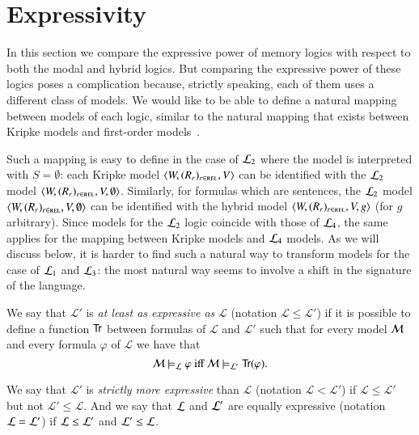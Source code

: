 \section{Expressivity}\label{expressivity}

In this section we compare the expressive power of memory logics
with respect to both the modal and hybrid logics.
But comparing the expressive power of these logics poses a complication
because, strictly speaking, each of them uses a different class of models.
We would like to be able to define a natural mapping between models
of each logic, similar to the natural mapping that exists between
Kripke models and first-order models~\cite{BRV01}.

Such a mapping is easy to define in the case of $\mathcal{L}_2$ where the model is interpreted with $S=\emptyset$: each
Kripke model $\langle W,(R_r)_{r \in \textsc{rel}},V \rangle$ can be identified with the $\mathcal{L}_2$
model $\langle W,(R_r)_{r \in \textsc{rel}}, V, \emptyset \rangle$. Similarly, for formulas
which are sentences, the $\mathcal{L}_2$ model $\langle W,(R_r)_{r \in \textsc{rel}},V,\emptyset \rangle$ can be identified with the hybrid model
$\langle W,(R_r)_{r \in \textsc{rel}},V,g \rangle$ (for $g$ arbitrary).
%
Since models for the $\mathcal{L}_2$ logic coincide with those of
$\mathcal{L}_4$, the same applies for the mapping between Kripke models
and $\mathcal{L}_4$ models.
%
As we will discuss below, it is harder to find such a natural way to
transform models for the case of $\mathcal{L}_1$ and $\mathcal{L}_3$: the most
natural way seems to involve a shift in the signature of the
language.

\begin{defn}
We say that
$\mathcal{L'}$ is \emph{at least as expressive as} $\mathcal{L}$
(notation $\mathcal{L} \le \mathcal{L'}$) if it is possible to
define a function ${\sf Tr}$ between formulas of  $\mathcal{L}$ and $\mathcal{L'}$
such that for every model $\mathcal{M}$ and every formula $\varphi$ of $\mathcal{L}$
we have that
\[
\mathcal{M} \models_\mathcal{L} \varphi \mbox{ iff } \mathcal{M} \models_{\mathcal{L}'} {\sf Tr}(\varphi).
\]

We say that $\mathcal{L'}$ is \emph{strictly more expressive} than $\mathcal{L}$
(notation $\mathcal{L} < \mathcal{L'}$) if $\mathcal{L} \le \mathcal{L'}$ but
not $\mathcal{L}' \le \mathcal{L}$.  And we say that $\mathcal{L}$ and $\mathcal{L}'$ are equally
expressive (notation $\mathcal{L} = \mathcal{L}'$) if $\mathcal{L} \le \mathcal{L}'$ and $\mathcal{L}' \le \mathcal{L}$.
\end{defn}


